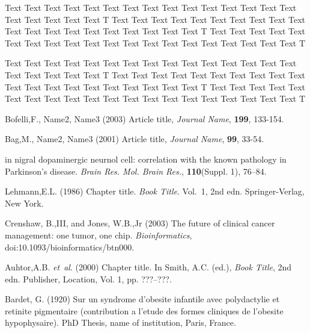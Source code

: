 \documentclass{bioinfo}
\begin{document}
Text Text Text Text Text Text  Text Text Text Text Text Text Text Text Text  Text Text Text Text Text T
Text Text Text Text Text Text  Text Text Text Text Text Text Text Text Text  Text Text Text Text Text T
Text Text Text Text Text Text  Text Text Text Text Text Text Text Text Text  Text Text Text Text Text T

Text Text Text Text Text Text  Text Text Text Text Text Text Text Text Text  Text Text Text Text Text T
Text Text Text Text Text Text  Text Text Text Text Text Text Text Text Text  Text Text Text Text Text T
Text Text Text Text Text Text  Text Text Text Text Text Text Text Text Text  Text Text Text Text Text T
%
%
%
%
%
%
%
%
%

\begin{thebibliography}{}
 Bofelli,F., Name2, Name3 (2003) Article title, {\it Journal Name}, {\bf 199}, 133-154.

 Bag,M., Name2, Name3 (2001) Article title, {\it Journal Name}, {\bf 99}, 33-54.

in nigral dopaminergic neurnol cell: correlation with the known
pathology in Parkinson's disease. \textit{Brain Res. Mol. Brain
Res.}, \textbf{110}(Suppl. 1), 76--84.

Lehmann,E.L. (1986) Chapter title. \textit{Book Title}. Vol.~1, 2nd edn. Springer-Verlag, New York.

Crenshaw, B.,III, and Jones, W.B.,Jr (2003) The future of clinical
cancer management: one tumor, one chip. \textit{Bioinformatics},
doi:10.1093/bioinformatics/btn000.

Auhtor,A.B. \textit{et~al}. (2000) Chapter title. In Smith, A.C.
(ed.), \textit{Book Title}, 2nd edn. Publisher, Location, Vol. 1, pp.
???--???.

Bardet, G. (1920) Sur un syndrome d'obesite infantile avec
polydactylie et retinite pigmentaire (contribution a l'etude des
formes cliniques de l'obesite hypophysaire). PhD Thesis, name of
institution, Paris, France.

\end{thebibliography}
\end{document}
